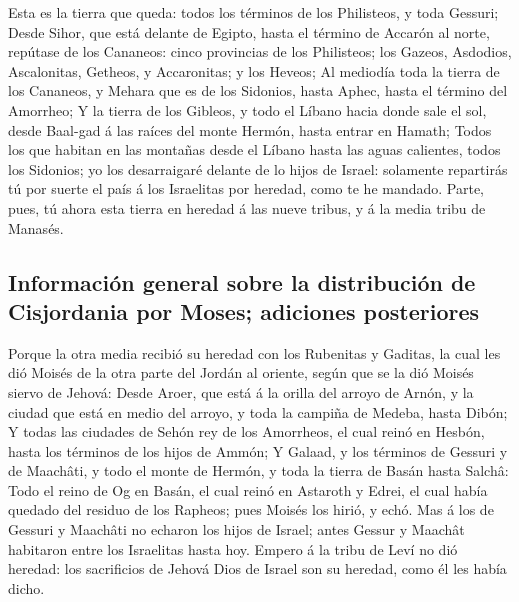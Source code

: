  Esta es la tierra que queda: todos los términos de los
Philisteos, y toda Gessuri;  Desde Sihor, que está delante
de Egipto, hasta el término de Accarón al norte, repútase de los
Cananeos: cinco provincias de los Philisteos; los Gazeos, Asdodios,
Ascalonitas, Getheos, y Accaronitas; y los Heveos;  Al
mediodía toda la tierra de los Cananeos, y Mehara que es de los
Sidonios, hasta Aphec, hasta el término del Amorrheo;  Y
la tierra de los Gibleos, y todo el Líbano hacia donde sale el sol,
desde Baal-gad á las raíces del monte Hermón, hasta entrar en Hamath;
 Todos los que habitan en las montañas desde el Líbano
hasta las aguas calientes, todos los Sidonios; yo los desarraigaré
delante de lo hijos de Israel: solamente repartirás tú por suerte el
país á los Israelitas por heredad, como te he mandado. 
Parte, pues, tú ahora esta tierra en heredad á las nueve tribus, y á la
media tribu de Manasés.

\hypertarget{informaciuxf3n-general-sobre-la-distribuciuxf3n-de-cisjordania-por-moses-adiciones-posteriores}{%
\subsection{Información general sobre la distribución de Cisjordania por
Moses; adiciones
posteriores}\label{informaciuxf3n-general-sobre-la-distribuciuxf3n-de-cisjordania-por-moses-adiciones-posteriores}}

 Porque la otra media recibió su heredad con los Rubenitas
y Gaditas, la cual les dió Moisés de la otra parte del Jordán al
oriente, según que se la dió Moisés siervo de Jehová: 
Desde Aroer, que está á la orilla del arroyo de Arnón, y la ciudad que
está en medio del arroyo, y toda la campiña de Medeba, hasta Dibón;
 Y todas las ciudades de Sehón rey de los Amorrheos, el
cual reinó en Hesbón, hasta los términos de los hijos de Ammón;
 Y Galaad, y los términos de Gessuri y de Maachâti, y
todo el monte de Hermón, y toda la tierra de Basán hasta Salchâ:
 Todo el reino de Og en Basán, el cual reinó en Astaroth
y Edrei, el cual había quedado del residuo de los Rapheos; pues Moisés
los hirió, y echó.  Mas á los de Gessuri y Maachâti no
echaron los hijos de Israel; antes Gessur y Maachât habitaron entre los
Israelitas hasta hoy.  Empero á la tribu de Leví no dió
heredad: los sacrificios de Jehová Dios de Israel son su heredad, como
él les había dicho.

